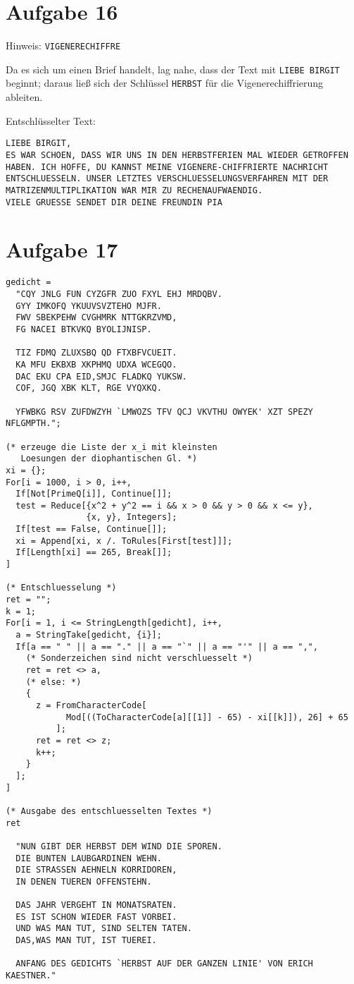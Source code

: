 \section*{Aufgabe 16}
Hinweis: \verb/VIGENERECHIFFRE/

Da es sich um einen Brief handelt, lag nahe, dass der Text mit 
\verb/LIEBE BIRGIT/ beginnt; daraus ließ sich der Schlüssel \verb/HERBST/ für
die Vigenerechiffrierung ableiten.

Entschlüsselter Text:
\begin{verbatim}
LIEBE BIRGIT,
ES WAR SCHOEN, DASS WIR UNS IN DEN HERBSTFERIEN MAL WIEDER GETROFFEN
HABEN. ICH HOFFE, DU KANNST MEINE VIGENERE-CHIFFRIERTE NACHRICHT 
ENTSCHLUESSELN. UNSER LETZTES VERSCHLUESSELUNGSVERFAHREN MIT DER
MATRIZENMULTIPLIKATION WAR MIR ZU RECHENAUFWAENDIG. 
VIELE GRUESSE SENDET DIR DEINE FREUNDIN PIA
\end{verbatim}

\section*{Aufgabe 17}
\lstset{language=Mathematica}
\begin{lstlisting}
gedicht = 
  "CQY JNLG FUN CYZGFR ZUO FXYL EHJ MRDQBV.
  GYY IMKOFQ YKUUVSVZTEHO MJFR.
  FWV SBEKPEHW CVGHMRK NTTGKRZVMD,
  FG NACEI BTKVKQ BYOLIJNISP.

  TIZ FDMQ ZLUXSBQ QD FTXBFVCUEIT.
  KA MFU EKBXB XKPHMQ UDXA WCEGQO.
  DAC EKU CPA EID,SMJC FLADKQ YUKSW.
  COF, JGQ XBK KLT, RGE VYQXKQ.

  YFWBKG RSV ZUFDWZYH `LMWOZS TFV QCJ VKVTHU OWYEK' XZT SPEZY NFLGMPTH.";

(* erzeuge die Liste der x_i mit kleinsten
   Loesungen der diophantischen Gl. *)
xi = {};
For[i = 1000, i > 0, i++,
  If[Not[PrimeQ[i]], Continue[]];
  test = Reduce[{x^2 + y^2 == i && x > 0 && y > 0 && x <= y},
                {x, y}, Integers];
  If[test == False, Continue[]];
  xi = Append[xi, x /. ToRules[First[test]]];
  If[Length[xi] == 265, Break[]];
]

(* Entschluesselung *)
ret = "";
k = 1;
For[i = 1, i <= StringLength[gedicht], i++,
  a = StringTake[gedicht, {i}];
  If[a == " " || a == "." || a == "`" || a == "'" || a == ",", 
    (* Sonderzeichen sind nicht verschluesselt *)
    ret = ret <> a,
    (* else: *)
    {
      z = FromCharacterCode[
            Mod[((ToCharacterCode[a][[1]] - 65) - xi[[k]]), 26] + 65
          ];
      ret = ret <> z;
      k++;
    }
  ];
]

(* Ausgabe des entschluesselten Textes *)
ret

  "NUN GIBT DER HERBST DEM WIND DIE SPOREN.
  DIE BUNTEN LAUBGARDINEN WEHN.
  DIE STRASSEN AEHNELN KORRIDOREN,
  IN DENEN TUEREN OFFENSTEHN.

  DAS JAHR VERGEHT IN MONATSRATEN.
  ES IST SCHON WIEDER FAST VORBEI.
  UND WAS MAN TUT, SIND SELTEN TATEN.
  DAS,WAS MAN TUT, IST TUEREI.

  ANFANG DES GEDICHTS `HERBST AUF DER GANZEN LINIE' VON ERICH KAESTNER."
\end{lstlisting}

